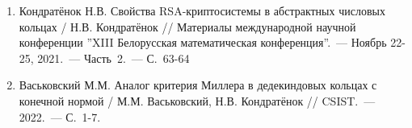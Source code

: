 \documentclass[_00_autoref.tex]{subfiles}
\begin{document}
\begin{enumerate}
    \item \label{source:XIII_Belarussian_math_conference_2021}
    Кондратёнок Н.В. Свойства RSA-криптосистемы в абстрактных числовых кольцах / Н.В. Кондратёнок // Материалы международной научной конференции ''XIII Белорусская математическая конференция''.~--- Ноябрь 22-25, 2021.~--- Часть~2.~--- С.~63-64

    \item \label{source:CSIST_2022}
    Васьковский М.М. Аналог критерия Миллера в дедекиндовых кольцах с конечной нормой / М.М. Васьковский, Н.В. Кондратёнок // CSIST.~--- 2022.~--- С.~1-7.

\end{enumerate}

\end{document}

